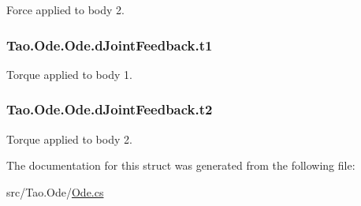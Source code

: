 Force applied to body 2. 

\hypertarget{struct_tao_1_1_ode_1_1_ode_1_1d_joint_feedback_a236449e03d589b755fcdda3226ae4be4}{
\subsubsection[{t1}]{ {\bf Tao.Ode.Ode.dJointFeedback.t1}}}
\label{struct_tao_1_1_ode_1_1_ode_1_1d_joint_feedback_a236449e03d589b755fcdda3226ae4be4}


Torque applied to body 1. 

\hypertarget{struct_tao_1_1_ode_1_1_ode_1_1d_joint_feedback_a95e30994f5104b0ab440305e91db0b96}{
\subsubsection[{t2}]{ {\bf Tao.Ode.Ode.dJointFeedback.t2}}}
\label{struct_tao_1_1_ode_1_1_ode_1_1d_joint_feedback_a95e30994f5104b0ab440305e91db0b96}


Torque applied to body 2. 



The documentation for this struct was generated from the following file:\begin{DoxyCompactItemize}
\item 
src/Tao.Ode/\hyperlink{_ode_8cs}{Ode.cs}\end{DoxyCompactItemize}
